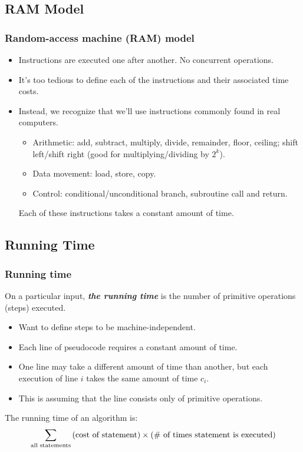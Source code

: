 \documentclass[notes,serif]{beamer}
\begin{document}
\subsection{RAM Model}

\begin{frame}
\frametitle{Random-access machine (RAM) model}
\begin{itemize}
  \item Instructions are executed one after another. No concurrent operations.
  \item It's too tedious to define each of the instructions and their associated time costs.
  \item Instead, we recognize that we'll use instructions commonly found in real computers.

    \begin{itemize}
      \item Arithmetic: add, subtract, multiply, divide, remainder, floor, ceiling; shift left/shift right (good for multiplying/dividing by $2^k$).
      \item Data movement: load, store, copy.
      \item Control: conditional/unconditional branch, subroutine call and return.
    \end{itemize}
    Each of these instructions takes a constant amount of time.
\end{itemize}
\end{frame}

\subsection{Running Time}
\begin{frame}
\frametitle{Running time}
On a particular input, {\bf \em the running time} is the number of primitive operations (steps) executed.
\begin{itemize}
  \item Want to define steps to be machine-independent.
  \item Each line of pseudocode requires a constant amount of time.
  \item One line may take a different amount of time than another, but each execution
of line $i$ takes the same amount of time $c_i$.
  \item This is assuming that the line consists only of primitive operations.
\end{itemize}
\begin{alertblock}{}
  The running time of an algorithm is:
  $$\sum_{\textnormal{all statements}}{\textnormal{(cost of statement)}} \times \textnormal {(\# of times statement is executed)}$$
\end{alertblock}
\end{frame}
\end{document}
